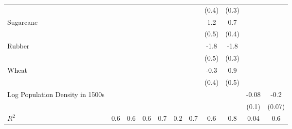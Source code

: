 {\begin{tabular}{l*{10}{c}}
                    &                     &                     &                     &                     &                     &                     &       (0.4)         &       (0.3)         &                     &                     \\
Sugarcane           &                     &                     &                     &                     &                     &                     &         1.2\sym{*}  &         0.7         &                     &                     \\
                    &                     &                     &                     &                     &                     &                     &       (0.5)         &       (0.4)         &                     &                     \\
Rubber              &                     &                     &                     &                     &                     &                     &        -1.8\sym{***}&        -1.8\sym{***}&                     &                     \\
                    &                     &                     &                     &                     &                     &                     &       (0.5)         &       (0.3)         &                     &                     \\
Wheat               &                     &                     &                     &                     &                     &                     &        -0.3         &         0.9         &                     &                     \\
                    &                     &                     &                     &                     &                     &                     &       (0.4)         &       (0.5)         &                     &                     \\
Log Population Density in 1500s&                     &                     &                     &                     &                     &                     &                     &                     &       -0.08         &        -0.2\sym{***}\\
                    &                     &                     &                     &                     &                     &                     &                     &                     &       (0.1)         &      (0.07)         \\
\(R^{2}\)           &         0.6         &         0.6         &         0.6         &         0.7         &         0.2         &         0.7         &         0.6         &         0.8         &        0.04         &         0.6         \\

\end{tabular}}
